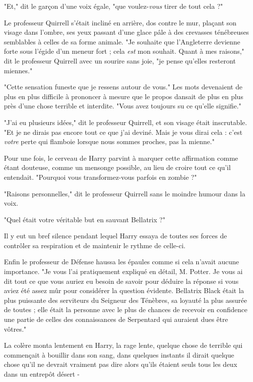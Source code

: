 "Et," dit le garçon d'une voix égale, "que voulez-\emph{vous}  tirer de tout cela ?"

Le professeur Quirrell s'était incliné en arrière, dos contre le mur, plaçant son visage dans l'ombre, ses yeux passant d'une glace pâle à des crevasses ténébreuses semblables à celles de sa forme animale. "Je souhaite que l'Angleterre devienne forte sous l'égide d'un meneur fort ; cela \emph{est}  mon souhait. Quant à mes raisons," dit le professeur Quirrell avec un sourire sans joie, "je pense qu'elles resteront miennes."

"Cette sensation funeste que je ressens autour de vous." Les mots devenaient de plus en plus difficile à prononcer à mesure que le propos dansait de plus en plus près d'une chose terrible et interdite. "Vous avez toujours su ce qu'elle signifie."

"J'ai eu plusieurs idées," dit le professeur Quirrell, et son visage était inscrutable. "Et je ne dirais pas encore tout ce que j'ai deviné. Mais je vous dirai cela : c'est \emph{votre}  perte qui flamboie lorsque nous sommes proches, pas la mienne."

Pour une fois, le cerveau de Harry parvint à marquer cette affirmation comme étant douteuse, comme un mensonge possible, au lieu de croire tout ce qu'il entendait. "Pourquoi vous transformez-vous parfois en zombie ?"

"Raisons personnelles," dit le professeur Quirrell sans le moindre humour dans la voix.

"Quel était votre véritable but en sauvant Bellatrix ?"

Il y eut un bref silence pendant lequel Harry essaya de toutes ses forces de contrôler sa respiration et de maintenir le rythme de celle-ci.

Enfin le professeur de Défense haussa les épaules comme si cela n'avait aucune importance. "Je vous l'ai pratiquement expliqué en détail, M. Potter. Je vous ai dit tout ce que vous auriez eu besoin de savoir pour déduire la réponse si vous aviez été assez mûr pour considérer la question évidente. Bellatrix Black était la plus puissante des serviteurs du Seigneur des Ténèbres, sa loyauté la plus assurée de toutes ; elle était la personne avec le plus de chances de recevoir en confidence une partie de celles des connaissances de Serpentard qui auraient dues être vôtres."

La colère monta lentement en Harry, la rage lente, quelque chose de terrible qui commençait à bouillir dans son sang, dans quelques instants il dirait quelque chose qu'il ne devrait vraiment pas dire alors qu'ils étaient seuls tous les deux dans un entrepôt désert -

